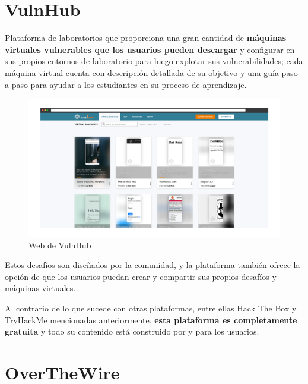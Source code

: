         \newpage
    
    
    \section{VulnHub}
    
        Plataforma de laboratorios que proporciona una gran cantidad de \textbf{máquinas virtuales vulnerables que los usuarios pueden descargar} y configurar en sus propios entornos de laboratorio para luego explotar sus vulnerabilidades; cada máquina virtual cuenta con descripción detallada de su objetivo y una guía paso a paso para ayudar a los estudiantes en su proceso de aprendizaje.
        
        \begin{figure}[h]
            \centering
            \includegraphics[width=\textwidth]{images/Capturas/Web de VulnHub.png}
            \caption{Web de VulnHub}
            \label{fig:VulnHub-web}
        \end{figure}
        
        Estos desafíos son diseñados por la comunidad, y la plataforma también ofrece la opción de que los usuarios puedan crear y compartir sus propios desafíos y máquinas virtuales.
        
        Al contrario de lo que sucede con otras plataformas, entre ellas Hack The Box y TryHackMe mencionadas anteriormente, \textbf{esta plataforma es completamente gratuita} y todo su contenido está construido por y para los usuarios.
        
        \newpage
    
    
    \section{OverTheWire}
    

